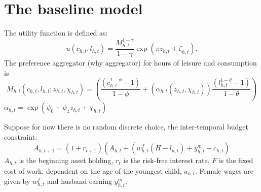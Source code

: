 \section{The baseline model}

The utility function is defined as:
\[ u(c_{h,t},l_{h,t}) = \frac{M^{1-\gamma}_{h,t}}{1 - \gamma} \exp{( \pi z_{h,t} + \zeta_{h,t} )} .\]
The preference aggregator (why aggregator) for hours of leisure and consumption is
\[ M_{h,t}(c_{h,t},l_{h,t};z_{h,t},\chi_{h,t}) = \left( \frac{(c_{h,t}^{1 - \phi} - 1)}{1 - \phi} + (\alpha_{h,t}(z_{h,t},\chi_{h,t})) \frac{(l_{h,t}^{1 - \theta} -1)}{ 1 - \theta}\right) \]
$\alpha_{h,t}= \exp{(\psi_0 + \psi_z z_{h,t} + \chi_{h,t})}$

Suppose for now there is no random discrete choice, the inter-temporal budget constraint:
\[ A_{h,t+1} = (1 + r_{t+1}) \left( A_{h,t} + \left(w_{h,t}^f(H-l_{h,t}) + y_{h,t}^m - c_{h,t} \right)\]
$A_{h,t}$ is the beginning asset holding, $r_t$ is the risk-free interest rate, $F$ is the fixed cost of work, dependent on the age of the youngest child, $a_{h,t}$. Female wages are given by $w_{h,t}^f$ and husband earning $y_{h,t}^m$.

